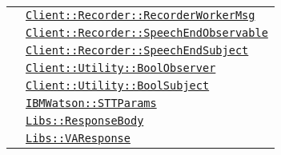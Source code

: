 \begin{longtable}{|>{\centering}m{3cm}|m{10cm}<{\centering}|}
& \hyperref[Client::Recorder::RecorderWorkerMsg]{\texttt{Client::Recorder::RecorderWorkerMsg}}\\
& \hyperref[Client::Recorder::SpeechEndObservable]{\texttt{Client::Recorder::SpeechEndObservable}}\\
& \hyperref[Client::Recorder::SpeechEndSubject]{\texttt{Client::Recorder::SpeechEndSubject}}\\
& \hyperref[Client::Utility::BoolObserver]{\texttt{Client::Utility::BoolObserver}}\\
& \hyperref[Client::Utility::BoolSubject]{\texttt{Client::Utility::BoolSubject}}\\
& \hyperref[IBMWatson::STTParams]{\texttt{IBMWatson::STTParams}}\\
& \hyperref[Libs::ResponseBody]{\texttt{Libs::ResponseBody}}\\
& \hyperref[Libs::VAResponse]{\texttt{Libs::VAResponse}}\\ \hline


\end{longtable}
